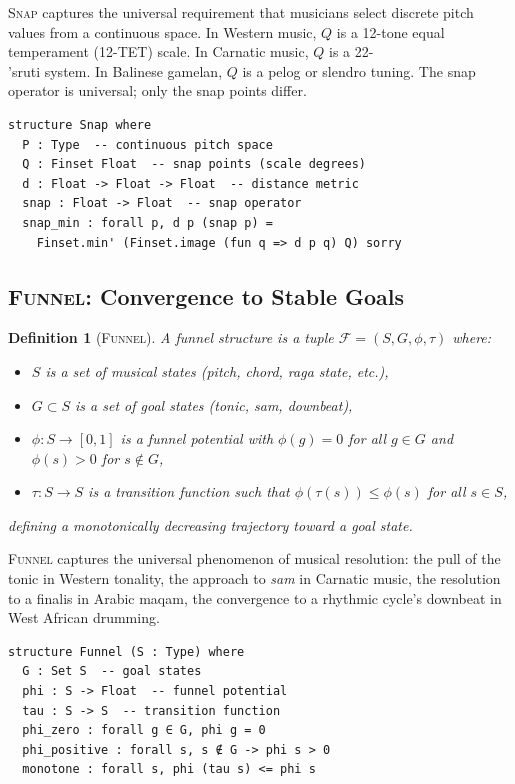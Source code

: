 \documentclass[cmj]{article}
\newtheorem{definition}{Definition}
\newcommand{\SNAP}{\textsc{Snap}}
\newcommand{\FUNNEL}{\textsc{Funnel}}
\begin{document}
\SNAP{} captures the universal requirement that musicians select discrete pitch
values from a continuous space. In Western music, $Q$ is a 12-tone equal
temperament (12-TET) scale. In Carnatic music, $Q$ is a 22-\\'{s}ruti system.
In Balinese gamelan, $Q$ is a pelog or slendro tuning. The snap operator is
universal; only the snap points differ.

\begin{lstlisting}[style=lean,caption={Lean 4 formalization of SNAP}]
structure Snap where
  P : Type  -- continuous pitch space
  Q : Finset Float  -- snap points (scale degrees)
  d : Float -> Float -> Float  -- distance metric
  snap : Float -> Float  -- snap operator
  snap_min : forall p, d p (snap p) =
    Finset.min' (Finset.image (fun q => d p q) Q) sorry
\end{lstlisting}

\subsection{\FUNNEL{}: Convergence to Stable Goals}
\label{sec:primitive-funnel}

\begin{definition}[\FUNNEL{}]
A \emph{funnel structure} is a tuple $\mathcal{F} = (S, G, \phi, \tau)$ where:
\begin{itemize}[nosep]
  \item $S$ is a set of musical states (pitch, chord, raga state, etc.),
  \item $G \subset S$ is a set of \emph{goal states} (tonic, sam, downbeat),
  \item $\phi: S \to [0, 1]$ is a \emph{funnel potential} with $\phi(g) = 0$
    for all $g \in G$ and $\phi(s) > 0$ for $s \notin G$,
  \item $\tau: S \to S$ is a \emph{transition function} such that
    $\phi(\tau(s)) \leq \phi(s)$ for all $s \in S$,
\end{itemize}
defining a monotonically decreasing trajectory toward a goal state.
\end{definition}

\FUNNEL{} captures the universal phenomenon of musical resolution: the pull of
the tonic in Western tonality, the approach to \emph{sam} in Carnatic music,
the resolution to a finalis in Arabic maqam, the convergence to a rhythmic
cycle's downbeat in West African drumming.

\begin{lstlisting}[style=lean,caption={Lean 4 formalization of FUNNEL}]
structure Funnel (S : Type) where
  G : Set S  -- goal states
  phi : S -> Float  -- funnel potential
  tau : S -> S  -- transition function
  phi_zero : forall g ∈ G, phi g = 0
  phi_positive : forall s, s ∉ G -> phi s > 0
  monotone : forall s, phi (tau s) <= phi s
\end{lstlisting}
\end{document}
